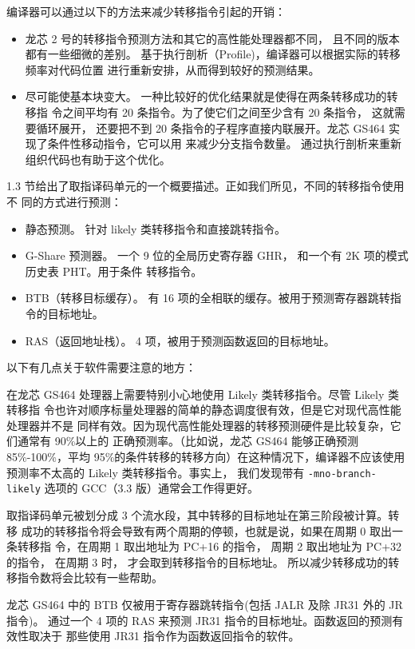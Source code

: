 编译器可以通过以下的方法来减少转移指令引起的开销：
\begin{itemize}
  \item 龙芯 2 号的转移指令预测方法和其它的高性能处理器都不同，
    且不同的版本都有一些细微的差别。
    基于执行剖析（Profile)，编译器可以根据实际的转移频率对代码位置
    进行重新安排，从而得到较好的预测结果。
  \item 尽可能使基本块变大。 一种比较好的优化结果就是使得在两条转移成功的转移指
    令之间平均有 20 条指令。为了使它们之间至少含有 20 条指令，
    这就需要循环展开， 还要把不到 20 条指令的子程序直接内联展开。龙芯 GS464
    实现了条件性移动指令，它可以用 来减少分支指令数量。
    通过执行剖析来重新组织代码也有助于这个优化。
\end{itemize}

1.3 节给出了取指译码单元的一个概要描述。正如我们所见，不同的转移指令使用不
同的方式进行预测：
\begin{itemize}
  \item 静态预测。 针对 likely 类转移指令和直接跳转指令。
  \item G-Share 预测器。 一个 9 位的全局历史寄存器 GHR，  和一个有 2K
    项的模式历史表 PHT。用于条件 转移指令。
  \item BTB（转移目标缓存）。 有 16
    项的全相联的缓存。被用于预测寄存器跳转指令的目标地址。
  \item RAS（返回地址栈）。 4 项，被用于预测函数返回的目标地址。
\end{itemize}

以下有几点关于软件需要注意的地方：

在龙芯 GS464 处理器上需要特别小心地使用 Likely 类转移指令。尽管 Likely 类转移指
令也许对顺序标量处理器的简单的静态调度很有效，但是它对现代高性能处理器并不是
同样有效。因为现代高性能处理器的转移预测硬件是比较复杂，它们通常有 90\%以上的
正确预测率。（比如说，龙芯 GS464 能够正确预测 85\%-100\%，平均
95\%的条件转移的转移方向）在这种情况下，编译器不应该使用预测率不太高的 Likely
类转移指令。事实上， 我们发现带有 \verb+-mno-branch-likely+ 选项的 GCC（3.3
版）通常会工作得更好。

取指译码单元被划分成 3 个流水段，其中转移的目标地址在第三阶段被计算。转移
成功的转移指令将会导致有两个周期的停顿，也就是说，如果在周期 0 取出一条转移指
令，在周期 1 取出地址为 PC+16 的指令，      周期 2 取出地址为 PC+32 的指令，
在周期 3 时， 才会取到转移指令的目标地址。
所以减少转移成功的转移指令数将会比较有一些帮助。

龙芯 GS464 中的 BTB 仅被用于寄存器跳转指令(包括 JALR 及除 JR31 外的 JR 指令)。
通过一个 4 项的 RAS 来预测 JR31 指令的目标地址。函数返回的预测有效性取决于
那些使用 JR31 指令作为函数返回指令的软件。

